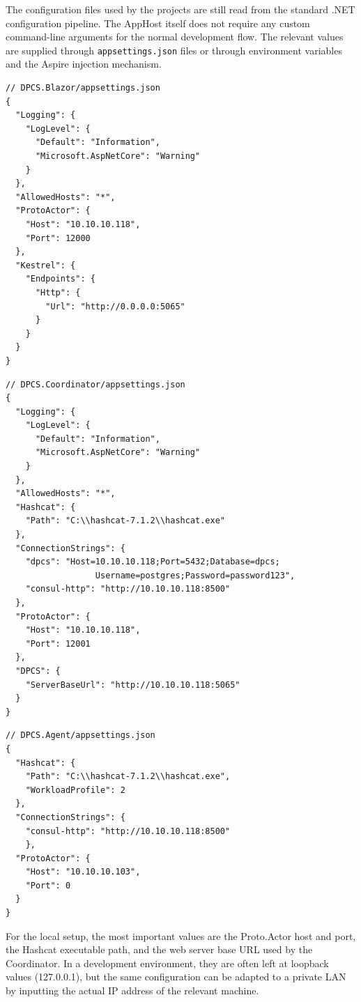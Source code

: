 The configuration files used by the projects are still read from the standard .NET configuration pipeline. The AppHost itself does not require any custom command-line arguments for the normal development flow. The relevant values are supplied through \verb|appsettings.json| files or through environment variables and the Aspire injection mechanism.

\begin{verbatim}
// DPCS.Blazor/appsettings.json
{
  "Logging": {
    "LogLevel": {
      "Default": "Information",
      "Microsoft.AspNetCore": "Warning"
    }
  },
  "AllowedHosts": "*",
  "ProtoActor": {
    "Host": "10.10.10.118",
    "Port": 12000
  },
  "Kestrel": {
    "Endpoints": {
      "Http": {
        "Url": "http://0.0.0.0:5065"
      }
    }
  }
}
\end{verbatim}

\begin{verbatim}
// DPCS.Coordinator/appsettings.json
{
  "Logging": {
    "LogLevel": {
      "Default": "Information",
      "Microsoft.AspNetCore": "Warning"
    }
  },
  "AllowedHosts": "*",
  "Hashcat": {
    "Path": "C:\\hashcat-7.1.2\\hashcat.exe"
  },
  "ConnectionStrings": {
    "dpcs": "Host=10.10.10.118;Port=5432;Database=dpcs;
                  Username=postgres;Password=password123",
    "consul-http": "http://10.10.10.118:8500"
  },
  "ProtoActor": {
    "Host": "10.10.10.118",
    "Port": 12001
  },
  "DPCS": {
    "ServerBaseUrl": "http://10.10.10.118:5065"
  }
}
\end{verbatim}

\begin{verbatim}
// DPCS.Agent/appsettings.json
{
  "Hashcat": {
    "Path": "C:\\hashcat-7.1.2\\hashcat.exe",
    "WorkloadProfile": 2
  },
  "ConnectionStrings": {
    "consul-http": "http://10.10.10.118:8500"
    },
  "ProtoActor": {
    "Host": "10.10.10.103",
    "Port": 0
  }
}
\end{verbatim}

For the local setup, the most important values are the Proto.Actor host and port, the Hashcat executable path, and the web server base URL used by the Coordinator. In a development environment, they are often left at loopback values (127.0.0.1), but the same configuration can be adapted to a private LAN by inputting the actual IP address of the relevant machine.

